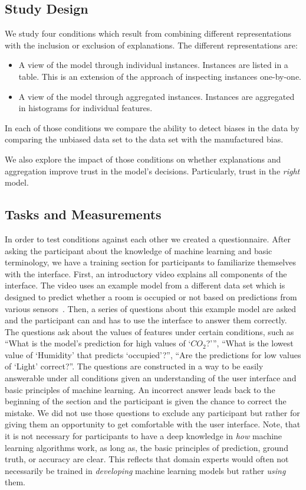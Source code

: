 \subsection{Study Design}
We study four conditions which result from combining different representations with the inclusion or exclusion of explanations.
The different representations are:

\begin{itemize}
	\item
    A view of the model through individual instances.
    Instances are listed in a table.
    This is an extension of the approach of inspecting instances one-by-one.
    \item
    A view of the model through aggregated instances.
    Instances are aggregated in histograms for individual features.
\end{itemize}

In each of those conditions we compare the ability to detect biases in the data by comparing the unbiased data set to the data set with the manufactured bias.

We also explore the impact of those conditions on whether explanations and aggregation improve trust in the model's decisions.
Particularly, trust in the \emph{right} model.

\subsection{Tasks and Measurements}
In order to test conditions against each other we created a questionnaire.
After asking the participant about the knowledge of machine learning and basic terminology, we have a training section for participants to familiarize themselves with the interface.
First, an introductory video explains all components of the interface.
The video uses an example model from a different data set which is designed to predict whether a room is occupied or not based on predictions from various sensors~\cite{occupancy}.
Then, a series of questions about this example model are asked and the participant can and has to use the interface to answer them correctly.
The questions ask about the values of features under certain conditions, such as ``What is the model's prediction for high values of `$CO_2$?''', ``What is the lowest value of `Humidity' that predicts `occupied'?'', ``Are the predictions for low values of `Light' correct?''.
The questions are constructed in a way to be easily answerable under all conditions given an understanding of the user interface and basic principles of machine learning.
An incorrect answer leads back to the beginning of the section and the participant is given the chance to correct the mistake.
We did not use those questions to exclude any participant but rather for giving them an opportunity to get comfortable with the user interface.
Note, that it is not necessary for participants to have a deep knowledge in \emph{how} machine learning algorithms work, as long as, the basic principles of prediction, ground truth, or accuracy are clear.  This reflects that domain experts would often not necessarily be trained in \emph{developing} machine learning models but rather \emph{using} them.

